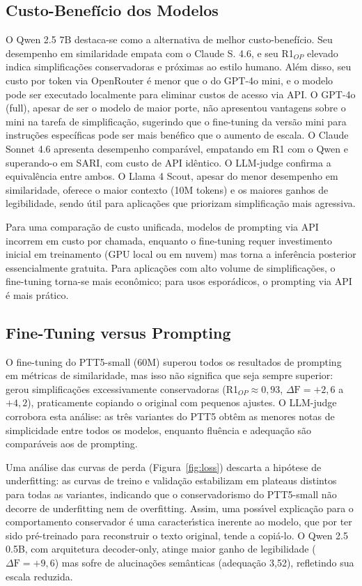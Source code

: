 \documentclass[a4paper, twocolumn, 11pt, twoside]{article}
\begin{document}
\subsection{Custo-Benefício dos Modelos}

O Qwen 2.5 7B destaca-se como a alternativa de melhor custo-benefício.
Seu desempenho em similaridade empata com o Claude S. 4.6, e seu
R1$_{OP}$ elevado indica simplificações conservadoras e próximas ao
estilo humano. Além disso, seu custo por token via OpenRouter é menor
que o do GPT-4o mini, e o modelo pode ser executado localmente para
eliminar custos de acesso via API. O GPT-4o (full), apesar de ser o
modelo de maior porte, não apresentou vantagens sobre o mini na tarefa
de simplificação, sugerindo que o fine-tuning da versão mini para
instruções específicas pode ser mais benéfico que o aumento de escala.
O Claude Sonnet 4.6 apresenta desempenho comparável, empatando em R1
com o Qwen e superando-o em SARI, com custo de API idêntico.
O LLM-judge confirma a equivalência entre ambos. O Llama 4 Scout,
apesar do menor desempenho em similaridade, oferece o maior contexto
(10M tokens) e os maiores ganhos de legibilidade, sendo útil para
aplicações que priorizam simplificação mais agressiva.

Para uma comparação de custo unificada, modelos de prompting via API
incorrem em custo por chamada, enquanto o fine-tuning requer
investimento inicial em treinamento (GPU local ou em nuvem) mas
torna a inferência posterior essencialmente gratuita. Para aplicações
com alto volume de simplificações, o fine-tuning torna-se mais
econômico; para usos esporádicos, o prompting via API é mais prático.

\subsection{Fine-Tuning versus Prompting}

O fine-tuning do PTT5-small (60M) superou todos os resultados de
prompting em métricas de similaridade, mas isso não significa que seja
sempre superior: gerou simplificações excessivamente conservadoras
(R1$_{OP} \approx 0,93$, $\Delta \mathrm{F} = +2,6$ a $+4,2$), praticamente
copiando o original com pequenos ajustes. O LLM-judge corrobora esta
análise: as três variantes do PTT5 obtêm as menores notas de
simplicidade entre todos os modelos, enquanto fluência e adequação
são comparáveis aos de prompting.

Uma análise das curvas de perda (Figura~\ref{fig:loss}) descarta a
hipótese de underfitting: as curvas de treino e validação
estabilizam em plateaus distintos para todas as variantes,
indicando que o conservadorismo do PTT5-small não decorre de
underfitting nem de overfitting. Assim, uma poss\'\i{}vel
explicação para o comportamento conservador é uma
caracter\'\i{}stica inerente ao modelo, que por ter sido
pré-treinado para reconstruir o texto original, tende a
copiá-lo. O Qwen 2.5 0.5B, com arquitetura decoder-only, atinge
maior ganho de legibilidade ($\Delta \mathrm{F} = +9,6$) mas sofre de alucinações
semânticas (adequação 3,52), refletindo sua escala reduzida.
\end{document}
